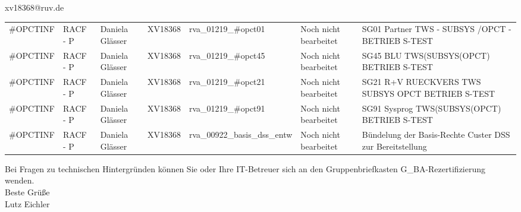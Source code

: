 \documentclass[a4paper,landscape,12pt]{letter}
\begin{document}
\begin{letter}{xv18368@ruv.de\hfill \break}
\begin{tiny}
\begin{longtable}{|p{35mm}|p{15mm}|p{25mm}|p{10mm}|p{40mm}|p{50mm}|p{50mm}|}
\#OPCTINF & RACF - P & Daniela Glässer & XV18368 & rva\_01219\_\#opct01 & Noch nicht bearbeitet & SG01 Partner TWS - SUBSYS /OPCT - BETRIEB S-TEST \\
\#OPCTINF & RACF - P & Daniela Glässer & XV18368 & rva\_01219\_\#opct45 & Noch nicht bearbeitet & SG45 BLU TWS(SUBSYS(OPCT) BETRIEB S-TEST \\
\#OPCTINF & RACF - P & Daniela Glässer & XV18368 & rva\_01219\_\#opct21 & Noch nicht bearbeitet & SG21 R+V RUECKVERS TWS SUBSYS OPCT BETRIEB S-TEST \\
\#OPCTINF & RACF - P & Daniela Glässer & XV18368 & rva\_01219\_\#opct91 & Noch nicht bearbeitet & SG91 Sysprog TWS(SUBSYS(OPCT) BETRIEB S-TEST \\
\#OPCTINF & RACF - P & Daniela Glässer & XV18368 & rva\_00922\_basis\_dss\_entw & Noch nicht bearbeitet & Bündelung der Basis-Rechte Custer DSS zur Bereitstellung \\

\hline
		\end{longtable}
		\end{tiny}
	
\begin{minipage}{\textwidth}
			Bei Fragen zu technischen Hintergründen können Sie 
			oder Ihre IT-Betreuer sich an den Gruppenbriefkasten 
			G\_BA-Rezertifizierung
			wenden.\\
			\linebreak
			Beste Grüße\\
			Lutz Eichler
	\end{minipage}
	\end{letter}
	
\end{document}
